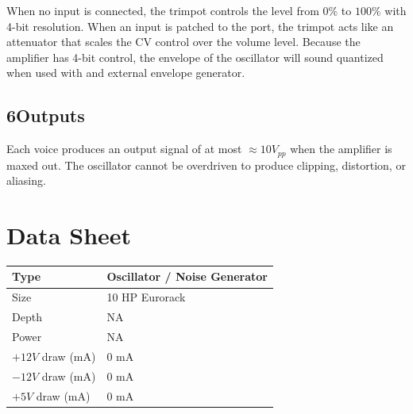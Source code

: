\documentclass[12pt,letter]{article}
\begin{document}
When no input is connected, the trimpot controls the level from $0\%$ to
$100\%$ with 4-bit resolution. When an input is patched to the port, the
trimpot acts like an attenuator that scales the CV control over the volume
level. Because the amplifier has 4-bit control, the envelope of the oscillator
will sound quantized when used with and external envelope generator.

\subsection*{6{\quad}Outputs}

Each voice produces an output signal of at most ${\approx}10V_{pp}$ when the
amplifier is maxed out. The oscillator cannot be overdriven to produce
clipping, distortion, or aliasing.


\clearpage
\section*{Data Sheet}

\begin{table}[!htp]
\begin{tabular}{|l|l|}
\hline
Type             & Oscillator / Noise Generator  \\
\hline
Size             & 10 HP Eurorack           \\
\hline
Depth            & NA                       \\
\hline
Power            & NA                       \\ %
\hline
$+12V$ draw (mA) & 0 mA                     \\
\hline
$-12V$ draw (mA) & 0 mA                     \\
\hline
$+5V$ draw (mA)  & 0 mA                     \\
\hline
\end{tabular}
\end{table}


\clearpage
\renewcommand\refname{References \& Acknowledgments}
\nocite{*}


\end{document}
